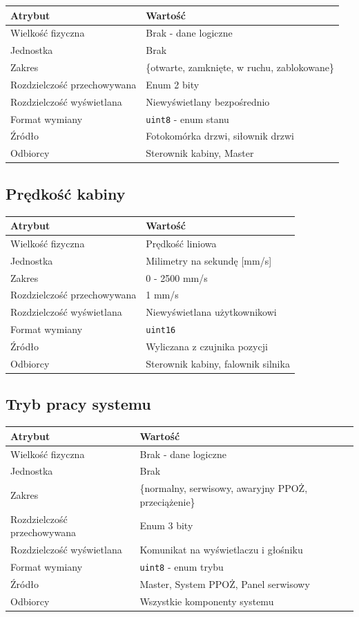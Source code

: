 \documentclass[a4paper,12pt]{article}
\begin{document}
\begin{tabularx}{\textwidth}{lX}
\toprule
\textbf{Atrybut} & \textbf{Wartość} \\
\midrule
Wielkość fizyczna & Brak - dane logiczne \\
Jednostka & Brak \\
Zakres & \{otwarte, zamknięte, w ruchu, zablokowane\} \\
Rozdzielczość przechowywana & Enum 2 bity \\
Rozdzielczość wyświetlana & Niewyświetlany bezpośrednio \\
Format wymiany & \texttt{uint8} - enum stanu \\
Źródło & Fotokomórka drzwi, siłownik drzwi \\
Odbiorcy & Sterownik kabiny, Master \\
\bottomrule
\end{tabularx}

\subsection{Prędkość kabiny}

\begin{tabularx}{\textwidth}{lX}
\toprule
\textbf{Atrybut} & \textbf{Wartość} \\
\midrule
Wielkość fizyczna & Prędkość liniowa \\
Jednostka & Milimetry na sekundę [mm/s] \\
Zakres & 0 - 2500 mm/s \\
Rozdzielczość przechowywana & 1 mm/s \\
Rozdzielczość wyświetlana & Niewyświetlana użytkownikowi \\
Format wymiany & \texttt{uint16} \\
Źródło & Wyliczana z czujnika pozycji \\
Odbiorcy & Sterownik kabiny, falownik silnika \\
\bottomrule
\end{tabularx}

\subsection{Tryb pracy systemu}

\begin{tabularx}{\textwidth}{lX}
\toprule
\textbf{Atrybut} & \textbf{Wartość} \\
\midrule
Wielkość fizyczna & Brak - dane logiczne \\
Jednostka & Brak \\
Zakres & \{normalny, serwisowy, awaryjny PPOŻ, przeciążenie\} \\
Rozdzielczość przechowywana & Enum 3 bity \\
Rozdzielczość wyświetlana & Komunikat na wyświetlaczu i głośniku \\
Format wymiany & \texttt{uint8} - enum trybu \\
Źródło & Master, System PPOŻ, Panel serwisowy \\
Odbiorcy & Wszystkie komponenty systemu \\
\bottomrule
\end{tabularx}
\end{document}
